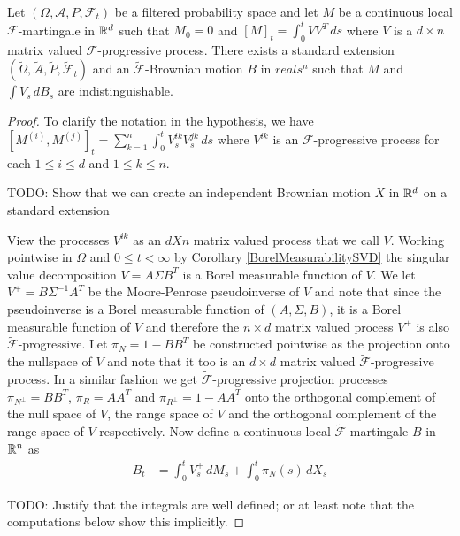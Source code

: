 \begin{thm}\label{DoobIntegralRepresentationTheoremContinuousLocalMartingale}Let $(\Omega, \mathcal{A}, P,  \mathcal{F}_t)$ be a filtered probability space and let $M$ be a continuous local $\mathcal{F}$-martingale in $\mathbb{R}^d$ such that $M_0 = 0$ and $[M]_t = \int_0^t V V^T \, ds$ where $V$ is a $d \times n$ matrix valued $\mathcal{F}$-progressive process.  There exists a standard extension $(\tilde{\Omega}, \tilde{\mathcal{A}}, \tilde{P},  \tilde{\mathcal{F}}_t)$ and an $\tilde{\mathcal{F}}$-Brownian motion $B$ in $reals^n$ such that $M$ and $\int V_s \, dB_s$ are indistinguishable.
\end{thm}
\begin{proof}
To clarify the notation in the hypothesis, we have $[M^{(i)}, M^{(j)}]_t = \sum_{k=1}^n \int_0^t V^{ik}_s V^{jk}_s \, ds$ where
$V^{ik}$ is an $\mathcal{F}$-progressive process for each $1 \leq i \leq d$ and $1 \leq k \leq n$.

TODO:  Show that we can create an independent Brownian motion $X$ in $\mathbb{R}^d$ on a standard extension

View the processes $V^{ik}$ as an $d X n$ matrix valued process that we call $V$.  Working pointwise in $\Omega$ and $0 \leq t < \infty$ by Corollary \ref{BorelMeasurabilitySVD} the singular value decomposition $V = A \Sigma B^T$ is a Borel measurable function of $V$.  We let $V^+ = B \Sigma^{-1} A^T$ be the Moore-Penrose pseudoinverse of $V$ and note that since the pseudoinverse is a Borel measurable function of $(A,\Sigma,B)$, it is a Borel measurable function of $V$ and therefore the $n \times d$ matrix valued process $V^+$ is also $\tilde{\mathcal{F}}$-progressive.  Let $\pi_N = 1 - BB^T$ be constructed pointwise as the projection onto the nullspace of $V$ and note that it too is an $d \times d$ matrix valued $\tilde{\mathcal{F}}$-progressive process.  In a similar fashion we get $\tilde{\mathcal{F}}$-progressive projection processes $\pi_{N^\perp} = BB^T$, $\pi_R = A A^T$ and $\pi_{R^\perp} = 1 - AA^T$ onto the orthogonal complement of the null space of $V$, the range space of $V$ and the orthogonal complement of the range space of $V$ respectively.  Now define a continuous local $\tilde{\mathcal{F}}$-martingale $B$ in $\mathbb{R}^n$ as
\begin{align*}
B_t &= \int_0^t V^+_s \, dM_s + \int_0^t \pi_N(s) \, dX_s
\end{align*}

TODO: Justify that the integrals are well defined; or at least note that the computations below show this implicitly.


\end{proof}
